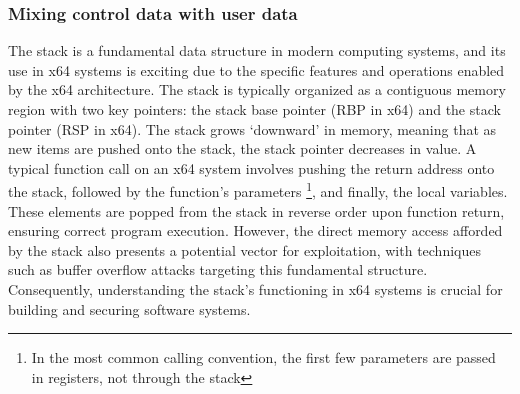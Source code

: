 \documentclass{article}
\begin{document}
\subsubsection{Mixing control data with user data}
The stack is a fundamental data structure in modern computing systems, and its use in x64 systems is exciting due to the specific features and operations enabled by the x64 architecture. The stack is typically organized as a contiguous memory region with two key pointers: the stack base pointer (RBP in x64) and the stack pointer (RSP in x64). The stack grows `downward' in memory, meaning that as new items are pushed onto the stack, the stack pointer decreases in value. A typical function call on an x64 system involves pushing the return address onto the stack, followed by the function's parameters \footnote{In the most common calling convention, the first few parameters are passed in registers, not through the stack}, and finally, the local variables. These elements are popped from the stack in reverse order upon function return, ensuring correct program execution. However, the direct memory access afforded by the stack also presents a potential vector for exploitation, with techniques such as buffer overflow attacks targeting this fundamental structure. Consequently, understanding the stack's functioning in x64 systems is crucial for building and securing software systems.
\end{document}
